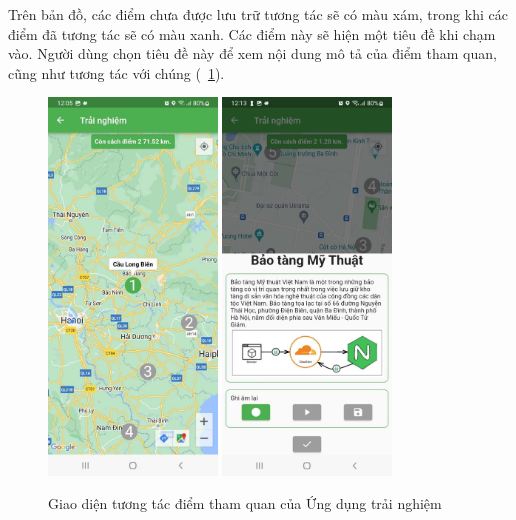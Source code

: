 Trên bản đồ, các điểm chưa được lưu trữ tương tác sẽ có màu xám, trong khi
các điểm đã tương tác sẽ có màu xanh. Các điểm này sẽ hiện một tiêu đề khi chạm
vào. Người dùng chọn tiêu đề này để xem nội dung mô tả của điểm tham quan, cũng
như tương tác với chúng (\figurename~\ref{fig:player-interaction}).

\begin{figure}
    \centering
    \includegraphics[width=0.4\textwidth]{figures/player-interaction-1.jpg}
    \includegraphics[width=0.4\textwidth]{figures/player-interaction-2.jpg}
    \caption{Giao diện tương tác điểm tham quan của Ứng dụng trải nghiệm}
    \label{fig:player-interaction}
\end{figure}

